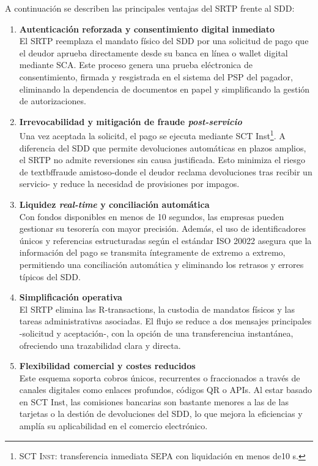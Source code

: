A continuación se describen las principales ventajas del SRTP frente al SDD:

\begin{enumerate}[label=\alph*)]
  \item \textbf{Autenticación reforzada y consentimiento digital inmediato}\\
      El SRTP reemplaza el mandato físico del SDD por una solicitud de pago que el deudor aprueba directamente desde su banca en línea o wallet digital mediante SCA. Este proceso genera una prueba eléctronica de consentimiento, firmada y resgistrada en el sistema del PSP del pagador, eliminando la dependencia de documentos en papel y simplificando la gestión de autorizaciones.

  \item \textbf{Irrevocabilidad y mitigación de fraude \emph{post-servicio}}\\
      Una vez aceptada la solicitd, el pago se ejecuta mediante SCT Inst\footnote{\textsc{SCT Inst}: transferencia inmediata SEPA con liquidación en menos de10 s.}. A diferencia del SDD que permite devoluciones automáticas en plazos amplios, el SRTP no admite reversiones sin causa justificada. Esto minimiza el riesgo de textbf{fraude amistoso}-donde el deudor reclama devoluciones tras recibir un servicio- y reduce la necesidad de provisiones por impagos.

  \item \textbf{Liquidez \emph{real-time} y conciliación automática}\\
      Con fondos disponibles en menos de 10 segundos, las empresas pueden gestionar su tesorería con mayor precisión. Además, el uso de identificadores únicos y referencias estructuradas según el estándar ISO 20022 asegura que la información del pago se transmita íntegramente de extremo a extremo, permitiendo una conciliación automática y eliminando los retrasos y errores típicos del SDD.

  \item \textbf{Simplificación operativa}\\
      El SRTP elimina las R-transactions, la custodia de mandatos físicos y las tareas administrativas asociadas. El flujo se reduce a dos mensajes principales -solicitud y aceptación-, con la opción de una transferenciua instantánea, ofreciendo una trazabilidad clara y directa.

  \item \textbf{Flexibilidad comercial y costes reducidos}\\
      Este esquema soporta cobros únicos, recurrentes o fraccionados a través de canales digitales como enlaces profundos, códigos QR o APIs. Al estar basado en SCT Inst, las comisiones bancarias son bastante menores a las de las tarjetas o la destión de devoluciones del SDD, lo que mejora la eficiencias y amplía su aplicabilidad en el comercio electrónico.
\end{enumerate}

